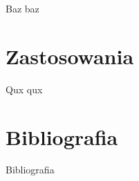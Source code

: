 \documentclass[polish, 12pt, aspectratio=169]{beamer}
\begin{document}
\begin{frame}{Baz}
baz
\end{frame}

\section{Zastosowania}

\begin{frame}{Qux}
qux
\end{frame}

\section*{Bibliografia}

\begin{frame}[allowframebreaks]{Bibliografia}
    \nocite{*}
    \printbibliography[heading=none]
\end{frame}
\end{document}
